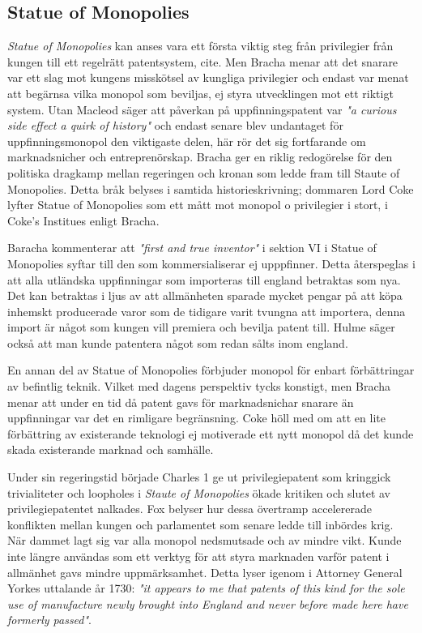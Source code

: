 
\subsection{Statue of Monopolies} 
\label{sub:statue_of_monopolies}

\emph{Statue of Monopolies} kan anses vara ett första viktig steg från privilegier från kungen till ett
regelrätt patentsystem, cite. Men Bracha\cite{bracha} menar att det snarare var ett slag mot kungens misskötsel av kungliga privilegier
och endast var menat att begärnsa vilka monopol som beviljas, ej styra utvecklingen mot ett riktigt
system. Utan Macleod \cite{macleod2} säger att påverkan på uppfinningspatent  var \emph{"a curious side effect a quirk of history"} och endast
senare blev undantaget för uppfinningsmonopol den viktigaste delen, här rör det sig fortfarande om marknadsnicher och entreprenörskap. Bracha ger en riklig redogörelse för den politiska dragkamp mellan regeringen och kronan som ledde fram till Staute of Monopolies. Detta bråk belyses i samtida historieskrivning; dommaren Lord Coke lyfter Statue of Monopolies som ett mått mot monopol o privilegier i stort, i Coke's Institues \cite{coke} enligt Bracha\cite{bracha}.

Baracha kommenterar att \emph{"first and true inventor"} i sektion VI i Statue of Monopolies syftar till den som kommersialiserar ej upppfinner. Detta återspeglas i att alla utländska uppfinningar som importeras till england betraktas som nya\cite{bracha}. Det kan betraktas i ljus av att allmänheten sparade mycket pengar på att köpa inhemskt producerade varor som de tidigare varit tvungna att importera, denna import är något som kungen vill premiera och bevilja patent till. Hulme\cite{hulme2} säger också att man kunde patentera något som redan sålts inom england.  

En annan del av Statue of Monopolies förbjuder monopol för enbart förbättringar av befintlig teknik. Vilket med dagens perspektiv tycks konstigt, men Bracha\cite{bracha} menar att under en tid då patent gavs för marknadsnichar snarare än uppfinningar var det en rimligare begränsning.
Coke höll med om att en lite förbättring av existerande teknologi ej motiverade ett nytt monopol då det kunde skada existerande marknad och samhälle\cite{bracha}.

Under sin regeringstid började Charles 1 ge ut privilegiepatent som kringgick trivialiteter och loopholes i \emph{Staute of
Monopolies} ökade kritiken och slutet av privilegiepatentet nalkades\cite{bracha}. Fox \cite{Fox} belyser hur dessa övertramp accelererade
konflikten mellan kungen och parlamentet som senare ledde till inbördes krig. När dammet lagt sig
var alla monopol nedsmutsade och av mindre vikt. Kunde inte längre användas som ett verktyg för att styra
marknaden varför patent i allmänhet gavs mindre uppmärksamhet. Detta lyser igenom i Attorney General Yorkes uttalande år 1730: \emph{"it appears to me that patents of this kind for the sole use of manufacture newly brought into England and never before made here have formerly passed"}\cite{macleod2}. 

